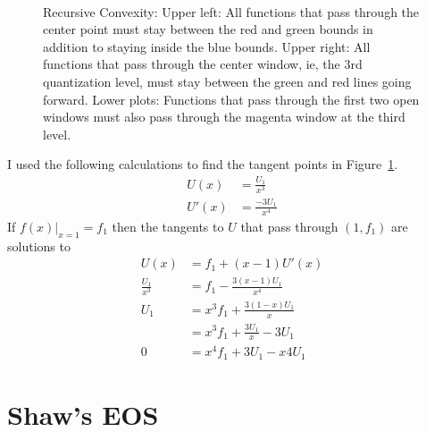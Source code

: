 \documentclass[]{article}
\begin{document}
\begin{figure}
  \centering
    \\
  
    \caption{Recursive Convexity: Upper left: All functions that pass
      through the center point must stay between the red and green
      bounds in addition to staying inside the blue bounds.  Upper
      right: All functions that pass through the center window, ie,
      the 3rd quantization level, must stay between the green and red
      lines going forward.  Lower plots: Functions that pass through
      the first two open windows must also pass through the magenta
      window at the third level.}
  \label{fig:recursive}
\end{figure}

I used the following calculations to find the tangent points in
Figure~\ref{fig:recursive}.
\begin{align*}
  U(x) &= \frac{U_1}{x^3} \\
  U'(x) &= \frac{-3U_1}{x^4}
\end{align*}
If $\left. f(x)\right|_{x=1} = f_1$ then the tangents to $U$ that pass
through $(1, f_1)$ are solutions to
\begin{align*}
  U(x) &= f_1 + (x-1)U'(x) \\
  \frac{U_1}{x^3} &=  f_1 - \frac{3(x-1)U_1}{x^4} \\
  U_1 &= x^3 f_1 + \frac{3(1-x)U_1}{x} \\
  &=  x^3 f_1 + \frac{3U_1}{x} - 3U_1 \\
  0 &= x^4 f_1 + 3U_1 - x4U_1
\end{align*}

\afterpage{\clearpage} %

\newpage

\section{Shaw's EOS}
\label{sec:shaw}
\end{document}
